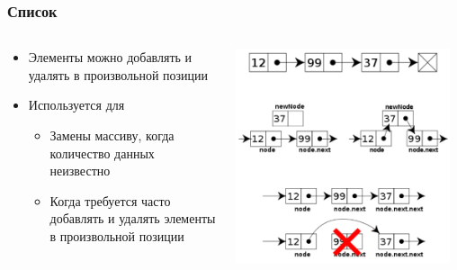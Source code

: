 \documentclass{../../slides-style}
\begin{document}
	
	\begin{frame}[plain]
        \titlepage
    \end{frame}
	
	\begin{frame}
		\frametitle{Список}
		\begin{columns}
			\begin{column}{0.55\textwidth}
				\begin{itemize}
					\item Элементы можно добавлять и удалять в произвольной позиции
					\item Используется для
					\begin{itemize}
						\item Замены массиву, когда количество данных неизвестно
						\item Когда требуется часто добавлять и удалять элементы в произвольной позиции
					\end{itemize}
				\end{itemize}
			\end{column}
			\begin{column}{0.45\textwidth}
				\begin{center}
					\includegraphics[width=0.95\textwidth]{list.png}
				\end{center}
			\end{column}
		\end{columns}
	\end{frame}
\end{document}
